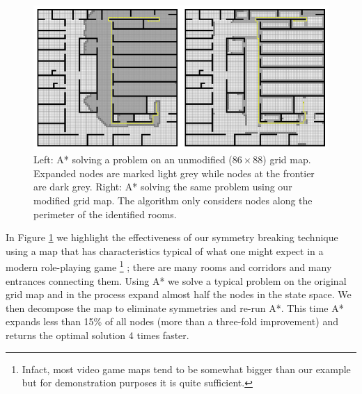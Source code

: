 \begin{figure}[t]
\centering
	    \includegraphics[width=0.95\columnwidth, trim = 10mm 10mm 10mm 0mm]{diagrams/oha_contrast.png}
		\caption{Left: A* solving a problem on an unmodified ($86\times88$) grid map. 
		Expanded nodes are marked light grey while nodes at the frontier are dark grey.
		Right: A* solving the same problem using our modified grid map. 
		The algorithm only considers nodes along the perimeter of the identified rooms.}
	\label{fig-contrast}
\end{figure}

In Figure \ref{fig-contrast} we highlight the effectiveness of our symmetry breaking technique using
a map that has characteristics typical of what one might expect in a modern role-playing game \footnote{
Infact, most video game maps tend to be somewhat bigger than our example but for demonstration 
purposes it is quite sufficient.}
; there are many rooms and corridors and many entrances connecting them.
Using A* we solve a typical problem on the original grid map and in the process expand almost half the nodes
in the state space.
We then decompose the map to eliminate symmetries and re-run A*.
This time A* expands less than 15\% of all nodes (more than a three-fold improvement) and returns the 
optimal solution 4 times faster.
